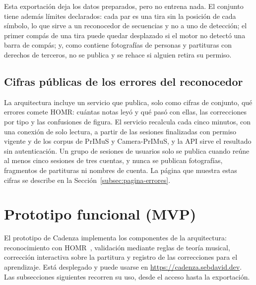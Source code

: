 \documentclass[conference]{IEEEtran}
\begin{document}
Esta exportación deja los datos preparados, pero no entrena nada. El
conjunto tiene además límites declarados: cada par es una tira sin la
posición de cada símbolo, lo que sirve a un reconocedor de secuencias y no
a uno de detección; el primer compás de una tira puede quedar desplazado
si el motor no detectó una barra de compás; y, como contiene fotografías
de personas y partituras con derechos de terceros, no se publica y se
rehace si alguien retira su permiso.

\subsection{Cifras públicas de los errores del reconocedor}

La arquitectura incluye un servicio que publica, solo como cifras de
conjunto, qué errores comete HOMR: cuántas notas leyó y qué pasó con
ellas, las correcciones por tipo y las confusiones de figura. El servicio
recalcula cada cinco minutos, con una conexión de solo lectura, a partir
de las sesiones finalizadas con permiso vigente y de los corpus de PrIMuS y
Camera-PrIMuS, y
la API sirve el resultado sin autenticación. Un grupo de sesiones de
usuarios solo se publica cuando reúne al menos cinco sesiones de tres
cuentas, y nunca se publican fotografías, fragmentos de partituras ni
nombres de cuenta.
La página que muestra estas cifras se describe en la
Sección~\ref{subsec:pagina-errores}.


\section{Prototipo funcional (MVP)}
\label{sec:prototipo}

El prototipo de Cadenza implementa los componentes de la arquitectura:
reconocimiento con HOMR~\cite{homr2024}, validación mediante reglas de
teoría musical, corrección interactiva sobre la partitura y registro de
las correcciones para el aprendizaje. Está desplegado y puede usarse en
\url{https://cadenza.sebdavid.dev}. Las subsecciones siguientes recorren
su uso, desde el acceso hasta la exportación.
\end{document}
